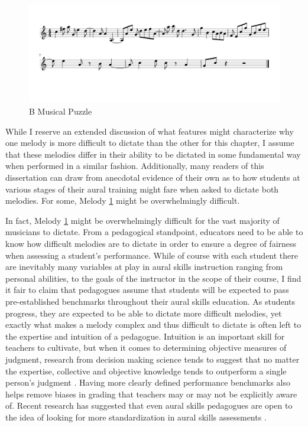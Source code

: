 \documentclass[12pt,]{book}
\begin{document}
\begin{figure}

{\centering \includegraphics[width=1\linewidth]{img/musicalpuzzle/MP2/MP_Y-1} 

}

\caption{B Musical Puzzle}\label{fig:musicalpuzzleB}
\end{figure}

While I reserve an extended discussion of what features might characterize why one melody is more difficult to dictate than the other for this chapter, I assume that these melodies differ in their ability to be dictated in some fundamental way when performed in a similar fashion.
Additionally, many readers of this dissertation can draw from anecdotal evidence of their own as to how students at various stages of their aural training might fare when asked to dictate both melodies.
For some, Melody \ref{fig:musicalpuzzleB} might be overwhelmingly difficult.

In fact, Melody \ref{fig:musicalpuzzleB} might be overwhelmingly difficult for the vast majority of musicians to dictate.
From a pedagogical standpoint, educators need to be able to know how difficult melodies are to dictate in order to ensure a degree of fairness when assessing a student's performance.
While of course with each student there are inevitably many variables at play in aural skills instruction ranging from personal abilities, to the goals of the instructor in the scope of their course, I find it fair to claim that pedagogues assume that students will be expected to pass pre-established benchmarks throughout their aural skills education.
As students progress, they are expected to be able to dictate more difficult melodies, yet exactly what makes a melody complex and thus difficult to dictate is often left to the expertise and intuition of a pedagogue.
Intuition is an important skill for teachers to cultivate, but when it comes to determining objective measures of judgment, research from decision making science tends to suggest that no matter the expertise, collective and objective knowledge tends to outperform a single person's judgment \citep{kahnemanThinkingFastSlow2012, loggAlgorithmAppreciationPeople2019, meehlClinicalStatisticalPrediction1954}.
Having more clearly defined performance benchmarks also helps remove biases in grading that teachers may or may not be explicitly aware of.
Recent research has suggested that even aural skills pedagogues are open to the idea of looking for more standardization in aural skills assessments \citep{paneyTeachingMelodicDictation2014}.
\end{document}
